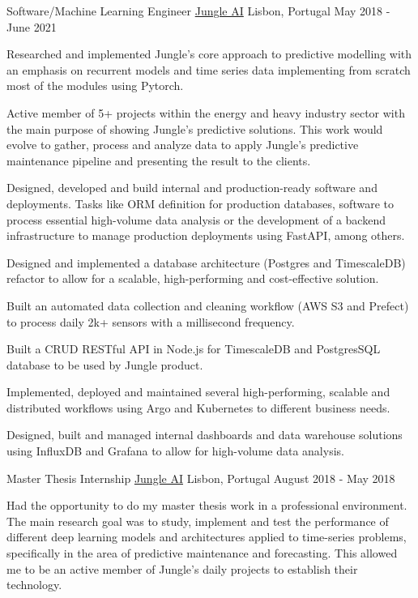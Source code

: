 \begin{cventries}
  \cventry
    {Software/Machine Learning Engineer} %
    {\href{https://www.jungle.ai}{Jungle AI}} %
    {Lisbon, Portugal} %
    {May 2018 - June 2021} %
    {
      \begin{cvitems} %
        \item {Researched and implemented Jungle’s core approach to predictive modelling with an emphasis on recurrent models and time series data implementing from scratch most of the modules using Pytorch.}
        \item {Active member of 5+ projects within the energy and heavy industry sector with the main purpose of showing Jungle’s predictive solutions. This work would evolve to gather, process and analyze data to apply Jungle's predictive maintenance pipeline and presenting the result to the clients.}
        \item {Designed, developed and build internal and production-ready software and deployments. Tasks like ORM definition for production databases, software to process essential high-volume data analysis or the development of a backend infrastructure to manage production deployments using FastAPI, among others.}
        \item {Designed and implemented a database architecture (Postgres and TimescaleDB) refactor to allow for a scalable, high-performing and cost-effective solution.}
        \item {Built an automated data collection and cleaning workflow (AWS S3 and Prefect) to process daily 2k+ sensors with a millisecond frequency.}
        \item {Built a CRUD RESTful API in Node.js for TimescaleDB and PostgresSQL database to be used by Jungle product.}
        \item {Implemented, deployed and maintained several high-performing, scalable and distributed workflows using Argo and Kubernetes to different business needs.}
        \item {Designed, built and managed internal dashboards and data warehouse solutions using InfluxDB and Grafana to allow for high-volume data analysis.}
      \end{cvitems}
    }

  \cventry
    {Master Thesis Internship} %
    {\href{https://www.jungle.ai}{Jungle AI}} %
    {Lisbon, Portugal} %
    {August 2018 - May 2018} %
    {
      \begin{cvitems} %
        \item {Had the opportunity to do my master thesis work in a professional environment. The main research goal was to study, implement and test the performance of different deep learning models and architectures applied to time-series problems, specifically in the area of predictive maintenance and forecasting. This allowed me to be an active member of Jungle’s daily projects to establish their technology.}
      \end{cvitems}
    }


\end{cventries}
